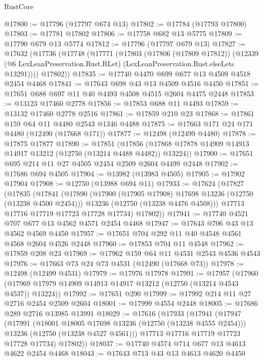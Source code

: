 \begin{lexlean}{RustCore}
\begin{coremodule}
@17800 := @17796 (@17797 @674 @13)
@17802 := @17784 (@17793 @17800)
@17803 := @17781 @17802
@17806 := @17758 @682 @13 @5775
@17809 := @17790 @679 @13 @5774
@17812 := @17796 (@17797 @679 @13)
@17827 := @17632
    (@17736
      (@17748
        (@17771
          (@17803
            (@17806 (@17809 @17812))
            (@12339 (@6 LexLeanPreservation.Rust.RLet) (LexLeanPreservation.Rust.elseLets @13291))))
        @17802))
@17835 := @17740 @4470 @699 @677 @13 @4509 @4518 @2454 @4468
@17841 := @17643 @698 @43 @13 @4509 @4516 @4450
@17851 := @17651 @688 @697 @11 @40 @4493 @4508 @4515 @2604 @4475 @2448
@17853 := @13123 @17460 @2778
@17856 := @17853 @688 @11 @4493
@17859 := @13132 @17460 @2778 @2516
@17861 := @17859 @210 @23
@17868 := @17861 @159 @64 @11 @4480 @2543 @1346 @4488
@17875 := @17663 @171 @24 @171 @4480 (@12490 (@17668 @171))
@17877 := @12498 (@12499 @4480)
@17878 := @17875 @17877
@17890 := @17851
    (@17856 (@17868 @17878 @14909 @14913 @14917 @13212 (@12750 (@13214 @4488 @4482)) @13224))
@17900 := @17651 @695 @214 @11 @27 @4505 @2454 @2509 @2604 @4499 @2448
@17902 := @17686 @694 @4505
@17904 := @13982 (@13983 @4505)
@17905 := @17902 @17904
@17908 := @12750 (@13988 @694 @11)
@17933 := @17624
    (@17827
      (@17835
        (@17841
          (@17890
            (@17900 (@17905 @17908) @17698 @13236 (@12750 (@13238 @4500 @2454)))
            @13236
            (@12750 (@13238 @4476 @4508)))
          @17713
          @17716
          @17719
          @17723
          @17728
          @17734)
        @17802))
@17941 := @17740 @4521 @707 @677 @13 @4562 @4571 @2454 @4468
@17947 := @17643 @706 @43 @13 @4562 @4569 @4450
@17957 := @17651 @704 @292 @11 @40 @4548 @4561 @4568 @2604 @4526 @2448
@17960 := @17853 @704 @11 @4548
@17962 := @17859 @208 @23
@17969 := @17962 @159 @64 @11 @4531 @2543 @4536 @4543
@17976 := @17663 @73 @24 @73 @4531 (@12490 (@17668 @73))
@17978 := @12498 (@12499 @4531)
@17979 := @17976 @17978
@17991 := @17957
    (@17960 (@17969 @17979 @14909 @14913 @14917 @13212 (@12750 (@13214 @4543 @4537)) @13224))
@17992 := @17651 @290
@17999 := @17992 @214 @11 @27 @2716 @2454 @2509 @2604
@18001 := @17999 @4554 @2448
@18005 := @17686 @289 @2716 @13985 @13991
@18029 := @17616
    (@17933
      (@17941
        (@17947
          (@17991
            (@18001 @18005 @17698 @13236 (@12750 (@13238 @4555 @2454)))
            @13236
            (@12750 (@13238 @4527 @4561)))
          @17713
          @17716
          @17719
          @17723
          @17728
          @17734)
        @17802))
@18037 := @17740 @4574 @714 @677 @13 @4613 @4622 @2454 @4468
@18043 := @17643 @713 @43 @13 @4613 @4620 @4450

\end{coremodule}
\end{lexlean}
